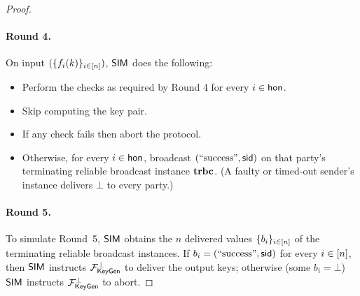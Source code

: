 \begin{proof}
    \medskip

    \paragraph{\bf Round 4.}
    On input $(\{f_i(k)\}_{i\in[n]})$,
    $\mathsf{SIM}$ does the following:
    \begin{itemize}
      \item Perform the checks as required by Round 4 for every $i\in\mathsf{hon}$.
      \item Skip computing the key pair.
      \item If any check fails then abort the protocol.
      \item Otherwise, for every $i\in\mathsf{hon}$, broadcast $(\text{``success''}, \mathsf{sid})$ on that party's
        terminating reliable broadcast instance $\mathbf{trbc}$. (A faulty or timed-out sender's
        instance delivers $\bot$ to every party.)
    \end{itemize}

    \paragraph{\bf Round 5.}
    To simulate Round~5, $\mathsf{SIM}$ obtains the $n$ delivered values $\{b_i\}_{i\in[n]}$ of the
    terminating reliable broadcast instances. If $b_i = (\text{``success''}, \mathsf{sid})$ for every $i\in[n]$, then $\mathsf{SIM}$
    instructs $\mathcal{F}_{\mathsf{KeyGen}}^\bot$ to deliver the output keys; otherwise (some $b_i = \bot$) $\mathsf{SIM}$ instructs
    $\mathcal{F}_{\mathsf{KeyGen}}^\bot$ to abort.


\end{proof}
